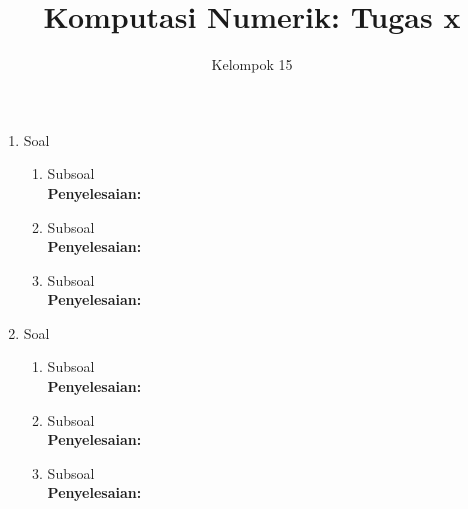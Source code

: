 \documentclass{article}
\title{\textbf{Komputasi Numerik: Tugas x}}
\author{Kelompok 15}
\date{}
\begin{document}
\maketitle

\begin{enumerate}
    \item Soal
    \begin{enumerate}
        \item Subsoal \\
        \textbf{Penyelesaian:}

        \item Subsoal \\
        \textbf{Penyelesaian:}

        \item Subsoal\\
        \textbf{Penyelesaian:} 
    \end{enumerate}

    \item Soal
    \begin{enumerate}
        \item Subsoal \\
        \textbf{Penyelesaian:}

        \item Subsoal \\
        \textbf{Penyelesaian:}

        \item Subsoal\\
        \textbf{Penyelesaian:} 
    \end{enumerate}
\end{enumerate}
\end{document}
